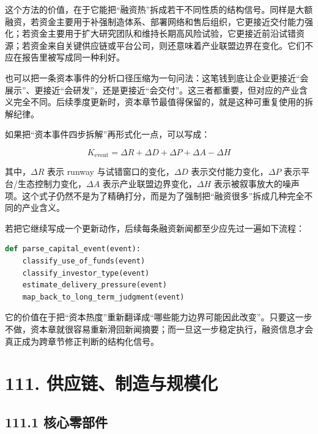 这个方法的价值，在于它能把“融资热”拆成若干不同性质的结构信号。同样是大额融资，若资金主要用于补强制造体系、部署网络和售后组织，它更接近交付能力强化；若资金主要用于扩大研究团队和维持长期高风险试验，它更接近前沿试错资源；若资金来自关键供应链或平台公司，则还意味着产业联盟边界在变化。它们不应在报告里被写成同一种利好。

也可以把一条资本事件的分析口径压缩为一句问法：这笔钱到底让企业更接近“会展示”、更接近“会研发”，还是更接近“会交付”。这三者都重要，但对应的产业含义完全不同。后续季度更新时，资本章节最值得保留的，就是这种可重复使用的拆解纪律。

如果把“资本事件四步拆解”再形式化一点，可以写成：

\begingroup
\footnotesize
\begin{equation*}
K_{\text{event}} = \Delta R + \Delta D + \Delta P + \Delta A - \Delta H
\end{equation*}
\endgroup

其中，\(\Delta R\) 表示 runway 与试错窗口的变化，\(\Delta D\) 表示交付能力变化，\(\Delta P\) 表示平台/生态控制力变化，\(\Delta A\) 表示产业联盟边界变化，\(\Delta H\) 表示被叙事放大的噪声项。这个式子仍然不是为了精确打分，而是为了强制把“融资很多”拆成几种完全不同的产业含义。

若把它继续写成一个更新动作，后续每条融资新闻都至少应先过一遍如下流程：

\begin{lstlisting}[language=python]
def parse_capital_event(event):
    classify_use_of_funds(event)
    classify_investor_type(event)
    estimate_delivery_pressure(event)
    map_back_to_long_term_judgment(event)
\end{lstlisting}

它的价值在于把“资本热度”重新翻译成“哪些能力边界可能因此改变”。只要这一步不做，资本章就很容易重新滑回新闻摘要；而一旦这一步稳定执行，融资信息才会真正成为跨章节修正判断的结构化信号。

\section*{111. 供应链、制造与规模化}

\subsection*{111.1 核心零部件}


